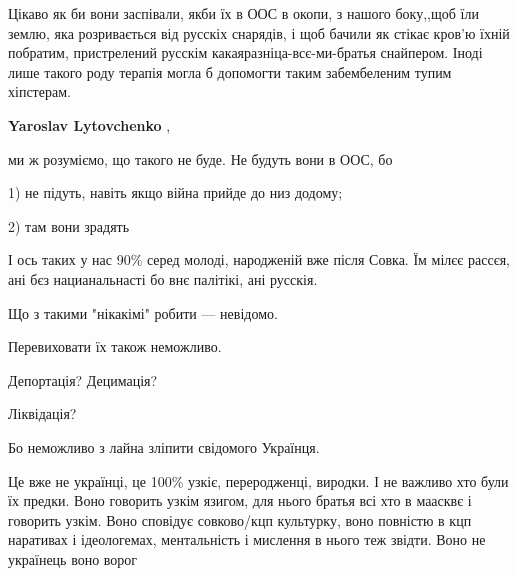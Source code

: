 \begin{itemize}
Цікаво як би вони заспівали, якби їх в ООС в окопи, з нашого боку,,щоб їли
землю, яка розривається від русскіх снарядів, і щоб бачили як стікає кров'ю
їхній побратим, пристрелений русскім какаяразніца-всє-ми-братья снайпером.
Іноді лише такого роду терапія могла б допомогти таким забембеленим тупим
хіпстерам.

\begin{itemize}
 
\textbf{Yaroslav Lytovchenko} , 

ми ж розуміємо, що такого не буде. Не будуть вони в ООС, бо 

1) не підуть, навіть якщо війна прийде до низ додому; 

2) там вони зрадять
\end{itemize}

 

І ось таких у нас 90\% серед молоді, народженій вже після Совка. Їм мілєє
рассєя, ані бєз нацианальнасті бо внє палітікі, ані русскія.

Що з такими "нікакімі" робити — невідомо.

Перевиховати їх також неможливо.

Депортація? Децимація?

Ліквідація?

Бо неможливо з лайна зліпити свідомого Українця.

 

Це вже не українці, це 100\% узкіє, переродженці, виродки. І не важливо хто були
їх предки. Воно говорить узкім язигом, для нього братья всі хто в маасквє і
говорить узкім. Воно сповідує совково/кцп культурку, воно повністю в кцп
наративах і ідеологемах, ментальність і мислення в нього теж звідти. Воно не
українець воно ворог


\end{itemize}
